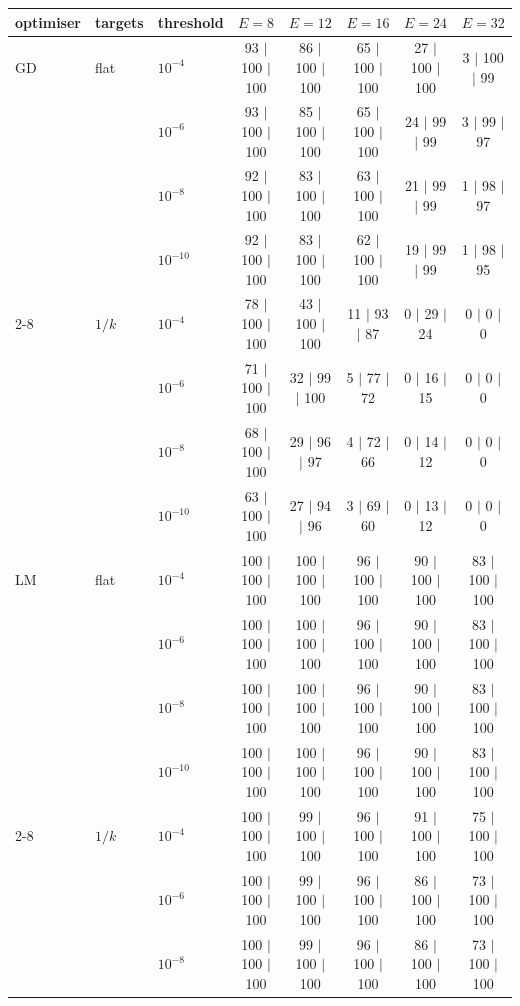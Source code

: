 \begin{tabular}{lllccccc}\toprule
optimiser & targets & threshold & $E=8$ & $E=12$ & $E=16$ & $E=24$ & $E=32$ \\\midrule
GD & flat & $10^{-4}$ & 93 $|$ 100 $|$ 100 & 86 $|$ 100 $|$ 100 & 65 $|$ 100 $|$ 100 & 27 $|$ 100 $|$ 100 & 3 $|$ 100 $|$ 99 \\
 &  & $10^{-6}$ & 93 $|$ 100 $|$ 100 & 85 $|$ 100 $|$ 100 & 65 $|$ 100 $|$ 100 & 24 $|$ 99 $|$ 99 & 3 $|$ 99 $|$ 97 \\
 &  & $10^{-8}$ & 92 $|$ 100 $|$ 100 & 83 $|$ 100 $|$ 100 & 63 $|$ 100 $|$ 100 & 21 $|$ 99 $|$ 99 & 1 $|$ 98 $|$ 97 \\
 &  & $10^{-10}$ & 92 $|$ 100 $|$ 100 & 83 $|$ 100 $|$ 100 & 62 $|$ 100 $|$ 100 & 19 $|$ 99 $|$ 99 & 1 $|$ 98 $|$ 95 \\
\cmidrule(l){2-8}
 & $1/k$ & $10^{-4}$ & 78 $|$ 100 $|$ 100 & 43 $|$ 100 $|$ 100 & 11 $|$ 93 $|$ 87 & 0 $|$ 29 $|$ 24 & 0 $|$ 0 $|$ 0 \\
 &  & $10^{-6}$ & 71 $|$ 100 $|$ 100 & 32 $|$ 99 $|$ 100 & 5 $|$ 77 $|$ 72 & 0 $|$ 16 $|$ 15 & 0 $|$ 0 $|$ 0 \\
 &  & $10^{-8}$ & 68 $|$ 100 $|$ 100 & 29 $|$ 96 $|$ 97 & 4 $|$ 72 $|$ 66 & 0 $|$ 14 $|$ 12 & 0 $|$ 0 $|$ 0 \\
 &  & $10^{-10}$ & 63 $|$ 100 $|$ 100 & 27 $|$ 94 $|$ 96 & 3 $|$ 69 $|$ 60 & 0 $|$ 13 $|$ 12 & 0 $|$ 0 $|$ 0 \\
\midrule
LM & flat & $10^{-4}$ & 100 $|$ 100 $|$ 100 & 100 $|$ 100 $|$ 100 & 96 $|$ 100 $|$ 100 & 90 $|$ 100 $|$ 100 & 83 $|$ 100 $|$ 100 \\
 &  & $10^{-6}$ & 100 $|$ 100 $|$ 100 & 100 $|$ 100 $|$ 100 & 96 $|$ 100 $|$ 100 & 90 $|$ 100 $|$ 100 & 83 $|$ 100 $|$ 100 \\
 &  & $10^{-8}$ & 100 $|$ 100 $|$ 100 & 100 $|$ 100 $|$ 100 & 96 $|$ 100 $|$ 100 & 90 $|$ 100 $|$ 100 & 83 $|$ 100 $|$ 100 \\
 &  & $10^{-10}$ & 100 $|$ 100 $|$ 100 & 100 $|$ 100 $|$ 100 & 96 $|$ 100 $|$ 100 & 90 $|$ 100 $|$ 100 & 83 $|$ 100 $|$ 100 \\
\cmidrule(l){2-8}
 & $1/k$ & $10^{-4}$ & 100 $|$ 100 $|$ 100 & 99 $|$ 100 $|$ 100 & 96 $|$ 100 $|$ 100 & 91 $|$ 100 $|$ 100 & 75 $|$ 100 $|$ 100 \\
 &  & $10^{-6}$ & 100 $|$ 100 $|$ 100 & 99 $|$ 100 $|$ 100 & 96 $|$ 100 $|$ 100 & 86 $|$ 100 $|$ 100 & 73 $|$ 100 $|$ 100 \\
 &  & $10^{-8}$ & 100 $|$ 100 $|$ 100 & 99 $|$ 100 $|$ 100 & 96 $|$ 100 $|$ 100 & 86 $|$ 100 $|$ 100 & 73 $|$ 100 $|$ 100 \\

\end{tabular}
